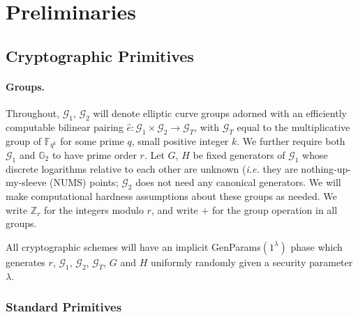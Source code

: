 \documentclass[letterpaper]{article}
\newcommand{\e}{\hat{e}}
\begin{document}
\section{Preliminaries}

\subsection{Cryptographic Primitives}

\paragraph{Groups.} Throughout, $\mathcal{G}_1$, $\mathcal{G}_2$ will denote
elliptic curve groups adorned with an efficiently computable bilinear pairing
$\e:\mathcal{G}_1\times\mathcal{G}_2\to\mathcal{G}_T$, with $\mathcal{G}_T$
equal to the multiplicative group of $\mathbb{F}_{q^k}$ for some prime $q$,
small positive integer $k$. We further require both $\mathcal{G}_1$ and
$\mathbb{G}_2$ to have prime order $r$. Let $G$, $H$ be fixed generators of
$\mathcal{G}_1$ whose discrete logarithms relative to each other are unknown
(\emph{i.e.} they are nothing-up-my-sleeve (NUMS) points; $\mathcal{G}_2$
does not need any canonical generators. We will make computational hardness
assumptions about these groups as needed. We write $\mathbb{Z}_r$
for the integers modulo $r$, and write $+$ for the group operation in all
groups.

All cryptographic schemes will have an implicit \textrm{GenParams}$(1^\lambda)$
phase which generates $r$, $\mathcal{G}_1$, $\mathcal{G}_2$, $\mathcal{G}_T$,
$G$ and $H$ uniformly randomly given a security parameter $\lambda$.

\subsubsection{Standard Primitives}
\end{document}
